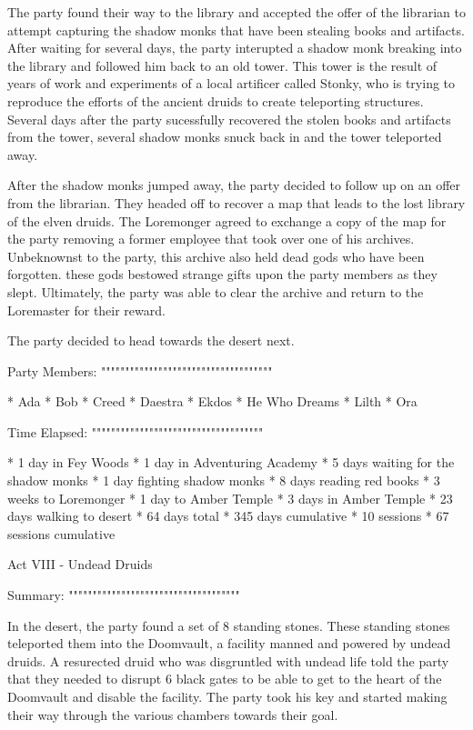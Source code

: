 The party found their way to the library and accepted the offer of the librarian to attempt capturing the shadow monks that have been stealing books and artifacts.
After waiting for several days, the party interupted a shadow monk breaking into the library and followed him back to an old tower.
This tower is the result of years of work and experiments of a local artificer called Stonky, who is trying to reproduce the efforts of the ancient druids to create teleporting structures.
Several days after the party sucessfully recovered the stolen books and artifacts from the tower, several shadow monks snuck back in and the tower teleported away.

After the shadow monks jumped away, the party decided to follow up on an offer from the librarian.
They headed off to recover a map that leads to the lost library of the elven druids.
The Loremonger agreed to exchange a copy of the map for the party removing a former employee that took over one of his archives.
Unbeknownst to the party, this archive also held dead gods who have been forgotten.
these gods bestowed strange gifts upon the party members as they slept.
Ultimately, the party was able to clear the archive and return to the Loremaster for their reward.

The party decided to head towards the desert next.

Party Members:
""""""""""""""""""""""""""""""""""""

  * Ada
  * Bob
  * Creed
  * Daestra
  * Ekdos
  * He Who Dreams
  * Lilth
  * Ora

Time Elapsed:
""""""""""""""""""""""""""""""""""""

  * 1 day in Fey Woods
  * 1 day in Adventuring Academy
  * 5 days waiting for the shadow monks
  * 1 day fighting shadow monks
  * 8 days reading red books
  * 3 weeks to Loremonger
  * 1 day to Amber Temple
  * 3 days in Amber Temple
  * 23 days walking to desert
  * 64 days total
  * 345 days cumulative
  * 10 sessions
  * 67 sessions cumulative

Act VIII - Undead Druids
^^^^^^^^^^^^^^^^^^^^^^^^^^^^^^^^^^^^

Summary:
""""""""""""""""""""""""""""""""""""

In the desert, the party found a set of 8 standing stones.
These standing stones teleported them into the Doomvault, a facility manned and powered by undead druids.
A resurected druid who was disgruntled with undead life told the party that they needed to disrupt 6 black gates to be able to get to the heart of the Doomvault and disable the facility.
The party took his key and started making their way through the various chambers towards their goal.

